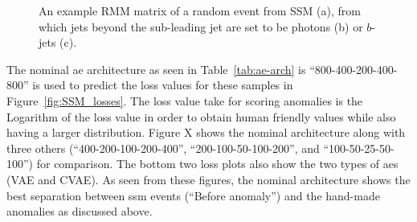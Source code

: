 \begin{figure}[H]
    \begin{center}
    \end{center}
    \caption{
        An example RMM matrix of a random event from SSM (a), from which jets beyond the sub-leading jet are set to be photons (b) or $b$-jets (c).
    }
    \label{fig:RMM_SSM_anomaly}
\end{figure}

The nominal \gls{ae} architecture as seen in Table~\ref{tab:ae-arch} is ``800-400-200-400-800'' is used to predict the loss values for these samples in Figure~\ref{fig:SSM_losses}. The loss value take for scoring anomalies is the Logarithm of the 
loss value in order to obtain human friendly values while also having a larger distribution. Figure X shows the nominal architecture along with three others (``400-200-100-200-400'', ``200-100-50-100-200'', and ``100-50-25-50-100'') for 
comparison. The bottom two loss plots also show the two types of \gls{ae}s (VAE and CVAE). As seen from these figures, the nominal architecture shows the best separation between \gls{ssm} events (``Before anomaly'')
and the hand-made anomalies as discussed above. 


